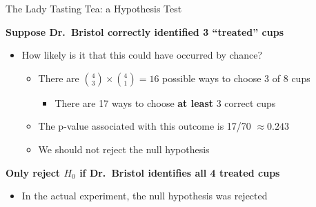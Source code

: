 \documentclass[10pt,xcolor=table,ignorenonframetext,handout,aspectratio=169]{beamer}
\newlength{\wideitemsep}
\let\olditem\item
\renewcommand{\item}{\setlength{\itemsep}{\wideitemsep}\olditem}
\begin{document}
\begin{frame}{The Lady Tasting Tea:  a Hypothesis Test}

%
\medskip
\textbf{Suppose Dr.~Bristol correctly identified 3 ``treated'' cups}

\medskip
\begin{itemize}
	
	\item How likely is it that this could have occurred by chance?
	
	\medskip
	\begin{itemize}
		
		\item There are ${4 \choose 3} \times {4 \choose 1} = 16$ possible ways to choose 3 of 8 cups
		
		\medskip
		\begin{itemize}
			
			\item There are 17 ways to choose \textbf{at least} 3 correct cups
			
		\end{itemize}
		
		\item The p-value associated with this outcome is 17/70 $\approx 0.243$
		
		\item We should not reject the null hypothesis
		
	\end{itemize}
	
\end{itemize}

\pause
\medskip
\medskip
\textbf{Only reject $H_0$ if Dr.~Bristol identifies all 4 treated cups}

\medskip
\begin{itemize}
	
	\item In the actual experiment, the null hypothesis was rejected
	
\end{itemize}

\end{frame}
\end{document}
